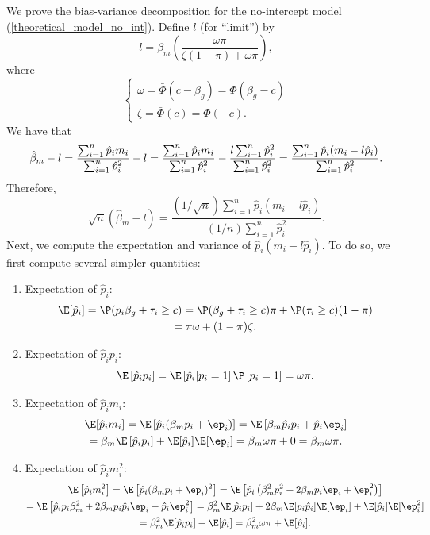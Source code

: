 \documentclass[12pt]{article}
\begin{document}
\begin{appendices}
We prove the bias-variance decomposition for the no-intercept model (\ref{theoretical_model_no_int}). Define $l$ (for ``limit'') by
$$l = \beta_m \left(\frac{\omega \pi}{\zeta(1-\pi) + \omega \pi}\right),$$ where
$$
\begin{cases}
\omega = \bar{\Phi}(c - \beta_g) = \Phi(\beta_g - c) \\
\zeta = \bar{\Phi}(c) = \Phi(-c).
\end{cases}
$$
We have that
\begin{equation*}
\hat{\beta}_m - l = \frac{\sum_{i=1}^n \hat{p}_i m_i}{ \sum_{i=1}^n \hat{p}^2_i} - l = \frac{\sum_{i=1}^n \hat{p}_i m_i}{ \sum_{i=1}^n \hat{p}^2_i} - \frac{l \sum_{i=1}^n \hat{p}_i^2 }{ \sum_{i=1}^n \hat{p}_i^2} \\ = \frac{\sum_{i=1}^n \hat{p}_i(m_i - l \hat{p}_i)}{ \sum_{i=1}^n \hat{p}_i^2}.
\end{equation*}
Therefore,
\begin{equation}\label{bc_decomp_1}
\sqrt{n}(\hat{\beta}_m - l) = \frac{(1/\sqrt{n})\sum_{i=1}^n \hat{p}_i(m_i - l \hat{p}_i)}{(1/n)\sum_{i=1}^n \hat{p}_i^2}.
\end{equation}
Next, we compute the expectation and variance of $\hat{p}_i(m_i - l\hat{p}_i)$. To do so, we first compute several simpler quantities:
\begin{enumerate}
\item Expectation of $\hat{p}_i$: 
\begin{multline*}
\E[\hat{p}_i] = \P(p_i\beta_g + \tau_i \geq c) =  \P(\beta_g + \tau_i \geq c)\pi + \P(\tau_i \geq c)(1-\pi) \\ = \pi \omega + (1-\pi)\zeta.
\end{multline*}
\item Expectation of $\hat{p}_i p_i$: $$\E\left[\hat{p}_i p_i\right] = \E\left[\hat{p}_i | p_i = 1 \right]\P\left[p_i = 1\right] = \omega \pi.$$
\item Expectation of $\hat{p}_i m_i$:
\begin{multline*}
\E[\hat{p}_i m_i] = \E\left[\hat{p}_i(\beta_m p_i + \ep_i)\right] = \E\left[\beta_m \hat{p}_i p_i + \hat{p}_i \ep_i \right] \\ = \beta_m \E\left[ \hat{p}_i p_i \right] + \E[\hat{p}_i]\E[\ep_i] = \beta_m \omega \pi + 0 = \beta_m \omega \pi.
\end{multline*}
\item Expectation of $\hat{p}_i m_i^2$: \begin{multline*}
\E\left[\hat{p}_i m_i^2\right] = \E \left[ \hat{p}_i( \beta_m p_i + \ep_i )^2 \right] = \E\left[ \hat{p}_i \left( \beta_m^2 p_i^2 + 2 \beta_m p_i \ep_i + \ep_i^2 \right)  \right] \\ = \E\left[ \hat{p}_i p_i \beta^2_m + 2 \beta_m p_i \hat{p}_i \ep_i + \hat{p}_i \ep_i^2 \right] = \beta^2_m \E[ \hat{p}_i p_i] + 2 \beta_m \E[p_i\hat{p}_i] \E[\ep_i] + \E[\hat{p}_i] \E[ \ep^2_i ] \\ = \beta^2_m \E[ \hat{p}_i p_i] + \E[\hat{p}_i] = \beta^2_m \omega \pi + \E[ \hat{p}_i]. 
\end{multline*}
\end{enumerate}


\end{appendices}
\end{document}
